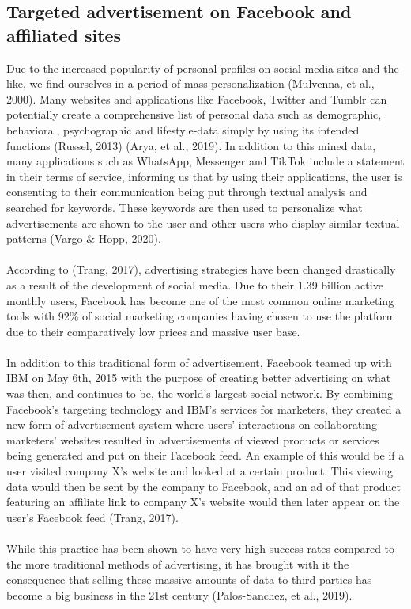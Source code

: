 \documentclass[11pt]{article}
\begin{document}
\subsection{Targeted advertisement on Facebook and affiliated sites}
Due to the increased popularity of personal profiles on social media sites and the like, we find ourselves in a period of mass personalization (Mulvenna, et al., 2000). Many websites and applications like Facebook, Twitter and Tumblr can potentially create a comprehensive list of personal data such as demographic, behavioral, psychographic and lifestyle-data simply by using its intended functions (Russel, 2013) (Arya, et al., 2019). In addition to this mined data, many applications such as WhatsApp, Messenger and TikTok include a statement in their terms of service, informing us that by using their applications, the user is consenting to their communication being put through textual analysis and searched for keywords. These keywords are then used to personalize what advertisements are shown to the user and other users who display similar textual patterns (Vargo \& Hopp, 2020). 
\\ \\
According to (Trang, 2017), advertising strategies have been changed drastically as a result of the development of social media. Due to their 1.39 billion active monthly users, Facebook has become one of the most common online marketing tools with 92\% of social marketing companies having chosen to use the platform due to their comparatively low prices and massive user base.  
\\ \\
In addition to this traditional form of advertisement, Facebook teamed up with IBM on May 6th, 2015 with the purpose of creating better advertising on what was then, and continues to be, the world’s largest social network. By combining Facebook’s targeting technology and IBM’s services for marketers, they created a new form of advertisement system where users’ interactions on collaborating marketers’ websites resulted in advertisements of viewed products or services being generated and put on their Facebook feed. An example of this would be if a user visited company X’s website and looked at a certain product. This viewing data would then be sent by the company to Facebook, and an ad of that product featuring an affiliate link to company X’s website would then later appear on the user’s Facebook feed (Trang, 2017).  
\\ \\
While this practice has been shown to have very high success rates compared to the more traditional methods of advertising, it has brought with it the consequence that selling these massive amounts of data to third parties has become a big business in the 21st century (Palos-Sanchez, et al., 2019). 
\\ \\
\end{document}
